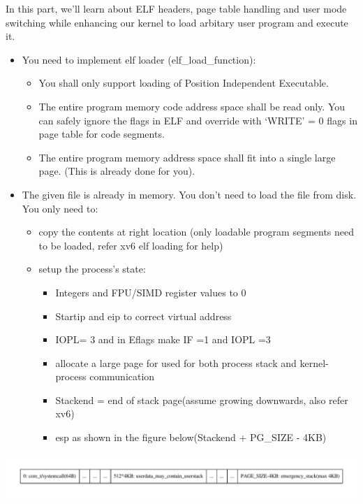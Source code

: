 \documentclass[]{article}
\providecommand{\tightlist}{%
  \setlength{\itemsep}{0pt}\setlength{\parskip}{0pt}}
\begin{document}
In this part, we'll learn about ELF headers, page table handling and
user mode switching while enhancing our kernel to load arbitary user
program and execute it.

\begin{itemize}
\tightlist
\item
  You need to implement elf loader (elf\_load\_function):

  \begin{itemize}
  \tightlist
  \item
    You shall only support loading of Position Independent Executable.
  \item
    The entire program memory code address space shall be read only. You
    can safely ignore the flags in ELF and override with `WRITE' = 0
    flags in page table for code segments.
  \item
    The entire program memory address space shall fit into a single
    large page. (This is already done for you).
  \end{itemize}
\item
  The given file is already in memory. You don't need to load the file
  from disk. You only need to:

  \begin{itemize}
  \tightlist
  \item
    copy the contents at right location (only loadable program segments
    need to be loaded, refer xv6 elf loading for help)
  \item
    setup the process's state:

    \begin{itemize}
    \tightlist
    \item
      Integers and FPU/SIMD register values to 0
    \item
      Startip and eip to correct virtual address
    \item
      IOPL= 3 and in Eflags make IF =1 and IOPL =3
    \item
      allocate a large page for used for both process stack and
      kernel-process communication
    \item
      Stackend = end of stack page(assume growing downwards, also refer
      xv6)
    \item
      esp as shown in the figure below(Stackend + PG\_SIZE - 4KB)
    \end{itemize}
  \end{itemize}
\end{itemize}

\includegraphics{graphviz-images/35fb0c92f47d3e29205a5e8b6f7f0643059d4b17.pdf}
\end{document}
